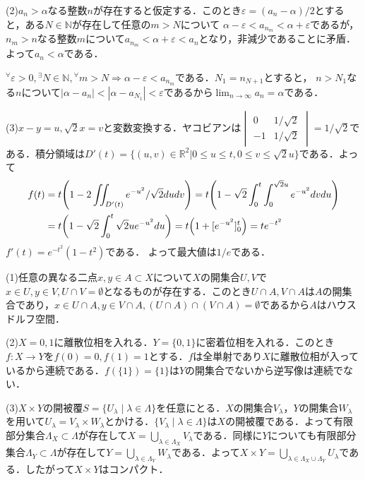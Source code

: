\documentclass[
		book,
		head_space=20mm,
		foot_space=20mm,
		gutter=10mm,
		line_length=190mm
]{jlreq}
\begin{document}
(2)$a_n >\alpha$なる整数$n$が存在すると仮定する．このとき$\varepsilon=(a_n-\alpha)/2$とすると，ある$N\in \mathbb{N}$が存在して任意の$m>N$について
$\alpha-\varepsilon<a_{n_m}<\alpha+\varepsilon$であるが，$n_m>n$なる整数$m$について$a_{n_m}<\alpha+\varepsilon<a_n$となり，非減少であることに矛盾．よって$a_n < \alpha$である．

${}^{\forall}\varepsilon>0,{}^{\exists}N \in \mathbb{N},{}^{\forall}m>N \Rightarrow \alpha-\varepsilon<a_{n_m}$である．$N_1=n_{N+1}$とすると，
$n > N_1$なる$n$について$|\alpha-a_n|<|\alpha-a_{N_1}|<\varepsilon$であるから$\lim_{n \to \infty}a_n=\alpha$である．

(3)$x-y=u,\sqrt{2}x=v$と変数変換する．ヤコビアンは$\begin{vmatrix}
	0 & 1/\sqrt{2} \\
	-1 & 1/\sqrt{2}
\end{vmatrix}=1/\sqrt{2}$である．積分領域は$D'(t)=\{ (u,v) \in \mathbb{R}^2 | 0 \le u \le t,0 \le v \le \sqrt{2}u\}$である．よって
\begin{align}
	f(t)&=t\qty(1-2\iint_{D'(t)}e^{-u^2}/\sqrt{2}dudv ) =t\qty(1-\sqrt{2} \int_0^t\int_0^{\sqrt{2}u}e^{-u^2}dvdu) \\
	&=t\qty(1-\sqrt{2} \int_0^t\sqrt{2}ue^{-u^2}du) = t\qty(1+[e^{-u^2}]_0^t) =te^{-t^2}
\end{align}
$f'(t)=e^{-t^2}(1-t^2)$である．
よって最大値は$1/e$である．

(1)任意の異なる二点$x,y \in A\subset X$について$X$の開集合$U,V$で$x \in U , y\in V ,U \cap V=\emptyset$となるものが存在する．このとき$U\cap A,V\cap A$は$A$の開集合であり，$x \in U\cap A , y\in V\cap A ,(U\cap A) \cap (V\cap A)=\emptyset$であるから$A$はハウスドルフ空間．

(2)$X={ 0,1}$に離散位相を入れる．$Y=\{ 0,1\}$に密着位相を入れる．このとき$f\colon X \rightarrow Y$を$f(0)=0,f(1)=1$とする．$f$は全単射であり$X$に離散位相が入っているから連続である．$f(\{1\})=\{1\}$は$Y$の開集合でないから逆写像は連続でない．

(3)$X \times Y$の開被覆$S=\{ U_\lambda \mid \lambda\in \Lambda\}$を任意にとる．$X$の開集合$V_\lambda$，$Y$の開集合$W_\lambda$を用いて$U_{\lambda}=V_\lambda \times W_\lambda$とかける．$\{ V_\lambda\mid \lambda\in\Lambda\}$は$X$の開被覆である．よって有限部分集合$\Lambda_X \subset \Lambda$が存在して$X=\bigcup_{\lambda \in \Lambda_X}V_\lambda$である．同様に$Y$についても有限部分集合$\Lambda_Y \subset \Lambda$が存在して$Y=\bigcup_{\lambda \in \Lambda_Y}W_\lambda$である．よって$X \times Y=\bigcup_{\lambda \in \Lambda_X \cup \Lambda_Y}U_{\lambda} $である．したがって$X\times Y$はコンパクト．
\end{document}
